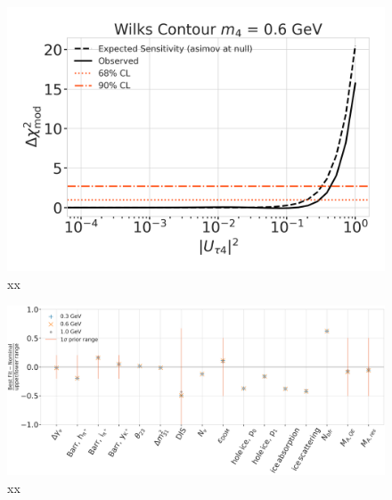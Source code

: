 \begin{figure}[h]
    \includegraphics{figures/results/best_fit/sensitivity_and_wilks_scan_0.6_GeV_with_1sigma.png}
	\caption[xx]{xx}
\end{figure}

\begin{figure}[h]
    \includegraphics{figures/results/best_fit/hnl_analysis_best_fit_deltas_normed_dist_to_nominal.png}
	\caption[xx]{xx}
\end{figure}


